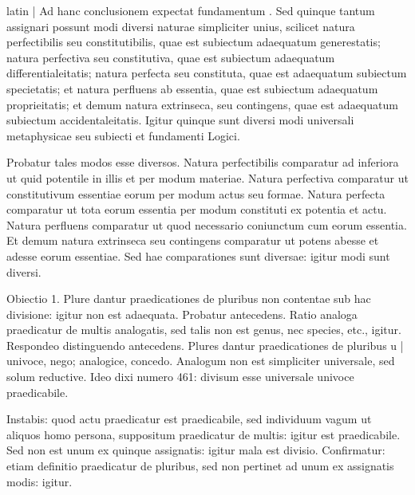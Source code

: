 \begin{otherlanguage*}{latin}
\pstart
\textnormal{|} Ad hanc conclusionem expectat fundamentum . Sed quinque tantum assignari possunt modi diversi naturae simpliciter unius, scilicet natura perfectibilis seu constitutibilis, quae est subiectum adaequatum generestatis; natura perfectiva seu constitutiva, quae est subiectum adaequatum differentialeitatis; natura perfecta seu constituta, quae est adaequatum subiectum specietatis; et natura perfluens ab essentia, quae est subiectum adaequatum proprieitatis; et demum natura extrinseca, seu contingens, quae est adaequatum subiectum accidentaleitatis. Igitur quinque sunt diversi modi universali metaphysicae seu subiecti et fundamenti Logici. 
\pend

\pstart
Probatur tales modos esse diversos. Natura perfectibilis comparatur ad inferiora ut quid potentile in illis et per modum materiae. Natura perfectiva comparatur ut constitutivum essentiae eorum per modum actus seu formae. Natura perfecta comparatur ut tota eorum essentia per modum constituti ex potentia et actu. Natura perfluens comparatur ut quod necessario coniunctum cum eorum essentia. Et demum natura extrinseca seu contingens comparatur ut potens abesse et adesse eorum essentiae. Sed hae comparationes sunt diversae:
igitur modi sunt diversi. 
\pend

\pstart
Obiectio 1. Plure dantur praedicationes de pluribus non contentae sub hac divisione:
igitur non est adaequata. Probatur antecedens. Ratio analoga praedicatur de multis analogatis, sed talis non est genus, nec species, etc., igitur. Respondeo distinguendo antecedens. Plures dantur praedicationes de pluribus u \textnormal{|} univoce, nego; analogice, concedo. Analogum non est simpliciter universale, sed solum reductive. Ideo dixi numero 461:
divisum esse universale univoce praedicabile. 
\pend

\pstart
Instabis:
quod actu praedicatur est praedicabile, sed individuum vagum ut aliquos homo persona, suppositum praedicatur de multis:
igitur est praedicabile. Sed non est unum ex quinque assignatis:
igitur mala est divisio. Confirmatur:
etiam definitio praedicatur de pluribus, sed non pertinet ad unum ex assignatis modis:
igitur. 
\pend


\end{otherlanguage*}
